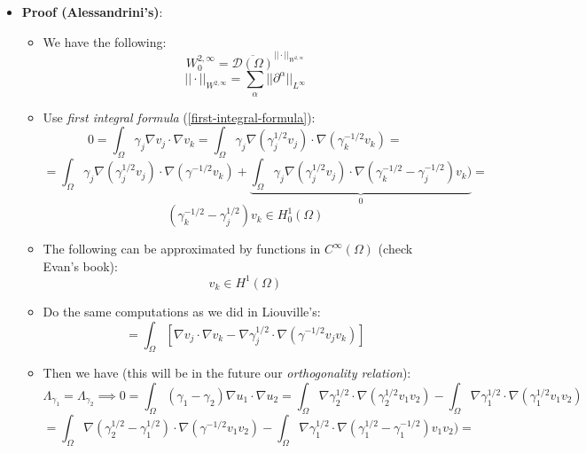 \documentclass{article}
\begin{document}
\begin{itemize}
    \item \textbf{Proof (Alessandrini's)}:
    \begin{itemize}
        \item We have the following:
        \begin{equation}
            W_0^{2, \infty} = \overline{\mathcal{D}(\Omega)}^{|| \cdot ||_{W^{2, \infty}}}
        \end{equation}
        \begin{equation}
            || \cdot ||_{W^{2, \infty}} = \sum_\alpha ||\partial^\alpha||_{L^\infty}
        \end{equation}
        \item Use \textit{first integral formula} (\ref{first-integral-formula}):
        \begin{equation}
            0 = \int_\Omega \gamma_j \nabla v_j \cdot \nabla v_k = \int_\Omega \gamma_j \nabla (\gamma^{1/2}_j v_j) \cdot \nabla (\gamma^{-1/2}_k v_k) =  
        \end{equation}
        \begin{equation}
            = \int_\Omega \gamma_j \nabla (\gamma^{1/2}_j v_j)\cdot \nabla (\gamma^{-1/2} v_k) + \underbrace{\int_\Omega \gamma_j \nabla (\gamma^{1/2}_j v_j)\cdot \nabla(\gamma^{-1/2}_k - \gamma^{-1/2}_j) v_k) }_{0} =
        \end{equation}
        \begin{equation}
            (\gamma^{-1/2}_k - \gamma^{1/2}_j) v_k \in H_0^1(\Omega)
        \end{equation}

        \item The following can be approximated by functions in $C^\infty(\Omega)$ (check Evan's book):
        \begin{equation}
            v_k \in H^1(\Omega)
        \end{equation}

        \item Do the same computations as we did in Liouville's:
        \begin{equation}
            = \int_\Omega [\nabla v_j \cdot \nabla v_k - \nabla \gamma^{1/2}_j \cdot \nabla (\gamma^{-1/2} v_j v_k)]
        \end{equation}
        
        \item Then we have (this will be in the future our \textit{orthogonality relation}):
        \begin{equation}
            \Lambda_{\gamma_1} = \Lambda_{\gamma_2} \implies 0 = \int_\Omega (\gamma_1 - \gamma_2) \nabla u_1 \cdot \nabla u_2 = \int_\Omega \nabla \gamma^{1/2}_2 \cdot \nabla (\gamma^{1/2}_2 v_1 v_2) - \int_\Omega \nabla \gamma^{1/2}_1 \cdot \nabla (\gamma^{1/2}_1 v_1 v_2)
        \end{equation}
        \begin{equation}
            = \int_\Omega \nabla (\gamma^{1/2}_2 - \gamma^{1/2}_1) \cdot \nabla(\gamma^{-1/2} v_1 v_2) - \int_\Omega \nabla \gamma^{1/2}_1 \cdot \nabla (\gamma^{1/2}_1 - \gamma^{-1/2}_1)v_1v_2) = 
        \end{equation}


\end{itemize}
\end{itemize}
\end{document}
